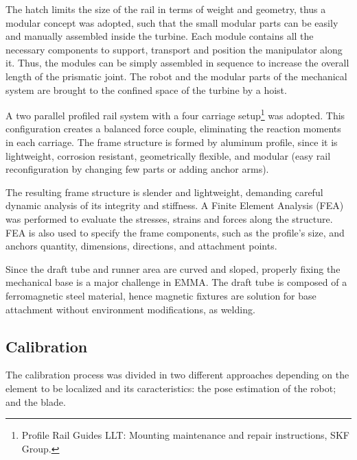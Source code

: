 The hatch limits the size of the rail in terms of weight
and geometry, thus a modular concept was adopted, such that the small modular
parts can be easily and manually assembled inside the turbine. Each module
contains all the necessary components to support, transport and position the
manipulator along it. Thus, the modules can be simply assembled in
sequence to increase the overall length of the prismatic joint. The robot and
the modular parts of the mechanical system are brought to the confined
space of the turbine by a hoist.

A two parallel profiled rail system with a four carriage
setup\footnote{Profile Rail Guides LLT: Mounting maintenance and repair
instructions, SKF Group.} was adopted. %
This configuration creates a balanced force couple, eliminating the reaction
moments in each carriage. The frame structure is formed by aluminum
profile, since it is lightweight, corrosion resistant, geometrically flexible,
and modular (easy rail reconfiguration by changing few parts or adding anchor
arms).

The resulting frame structure is slender and lightweight, demanding careful
dynamic analysis of its integrity and stiffness. A Finite Element Analysis (FEA)
was performed to evaluate the stresses, strains and forces along the structure.
FEA is also used to specify the frame components, such as the profile's size,
and anchors quantity, dimensions, directions, and attachment points.

Since the draft tube and runner area are curved and sloped, properly fixing
the mechanical base is a major challenge in EMMA. The draft tube is composed of a
ferromagnetic steel material, hence magnetic fixtures are solution for base
attachment without environment modifications, as welding.

\subsection{Calibration}
 
The calibration process was divided in two different approaches depending on the
element to be localized and its caracteristics: the pose estimation of the
robot; and the blade.
   
